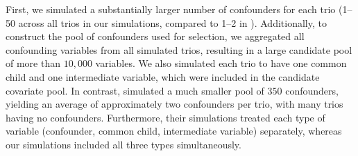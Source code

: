 \documentclass[12pt,letterpaper]{report}
\begin{document}
\begin{doublespace}
First, we simulated a substantially larger number of confounders for each trio (1--50 across all trios in our simulations, compared to 1--2 in \cite{yang2017identifying}). Additionally, to construct the pool of confounders used for selection, we aggregated all confounding variables from all simulated trios, resulting in a large candidate pool of more than $10{,}000$ variables. We also simulated each trio to have one common child and one intermediate variable, which were included in the candidate covariate pool. In contrast, \cite{yang2017identifying} simulated a much smaller pool of $350$ confounders, yielding an average of approximately two confounders per trio, with many trios having no confounders. Furthermore, their simulations treated each type of variable (confounder, common child, intermediate variable) separately, whereas our simulations included all three types simultaneously.



%


\end{doublespace}
\end{document}
